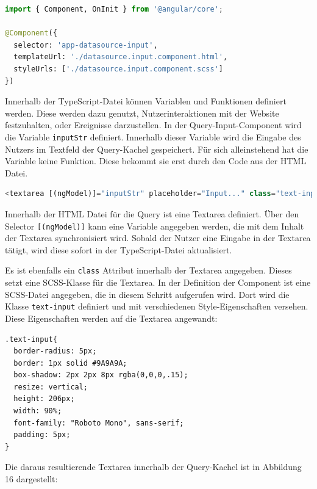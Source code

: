 \begin{lstlisting}[language=Python, caption={Definition eines Components}]
import { Component, OnInit } from '@angular/core';

@Component({
  selector: 'app-datasource-input',
  templateUrl: './datasource.input.component.html',
  styleUrls: ['./datasource.input.component.scss']
})
\end{lstlisting}

Innerhalb der TypeScript-Datei können Variablen und Funktionen definiert werden. Diese werden dazu genutzt, Nutzerinteraktionen mit der Website festzuhalten, oder Ereignisse darzustellen. In der Query-Input-Component wird die Variable \texttt{inputStr} definiert. Innerhalb dieser Variable wird die Eingabe des Nutzers im Textfeld der Query-Kachel gespeichert. Für sich alleinstehend hat die Variable keine Funktion. Diese bekommt sie erst durch den Code aus der HTML Datei. 

\begin{lstlisting}[language=Python, caption={Erstellung einer Textarea innerhalb der HTML-Datei}]
<textarea [(ngModel)]="inputStr" placeholder="Input..." class="text-input"></textarea>
\end{lstlisting}

Innerhalb der HTML Datei für die Query ist eine Textarea definiert. Über den Selector \texttt{[(ngModel)]} kann eine Variable angegeben werden, die mit dem Inhalt der Textarea synchronisiert wird. Sobald der Nutzer eine Eingabe in der Textarea tätigt, wird diese sofort in der TypeScript-Datei aktualisiert. 

Es ist ebenfalls ein \texttt{class} Attribut innerhalb der Textarea angegeben. Dieses setzt eine SCSS-Klasse für die Textarea. In der Definition der Component ist eine SCSS-Datei angegeben, die in diesem Schritt aufgerufen wird. Dort wird die Klasse \texttt{text-input} definiert und mit verschiedenen Style-Eigenschaften versehen. Diese Eigenschaften werden auf die Textarea angewandt:

\begin{lstlisting}[caption={Style-Definition innerhalb einer SCSS-Datei}]
.text-input{
  border-radius: 5px;
  border: 1px solid #9A9A9A;
  box-shadow: 2px 2px 8px rgba(0,0,0,.15);
  resize: vertical;
  height: 206px;
  width: 90%;
  font-family: "Roboto Mono", sans-serif;
  padding: 5px;
}
\end{lstlisting}

Die daraus resultierende Textarea innerhalb der Query-Kachel ist in Abbildung 16 dargestellt:

